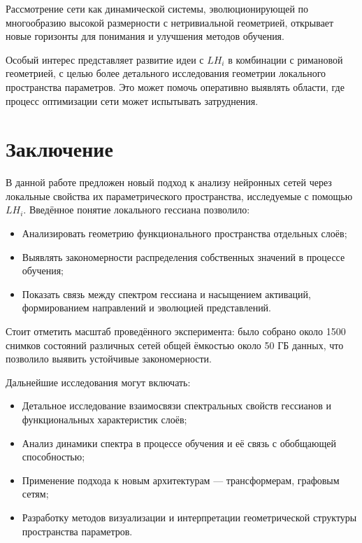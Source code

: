 \documentclass[a4paper,12pt]{article}
\begin{document}
Рассмотрение сети как динамической системы, эволюционирующей по многообразию высокой размерности с
нетривиальной геометрией, открывает новые горизонты для понимания и улучшения методов обучения.

Особый интерес представляет развитие идеи с $LH_i$ в комбинации с римановой геометрией,
с целью более детального исследования геометрии локального пространства параметров. Это может помочь оперативно
выявлять области, где процесс оптимизации сети может испытывать затруднения.

\section{Заключение}
В данной работе предложен новый подход к анализу нейронных сетей через локальные свойства их параметрического
пространства, исследуемые с помощью $LH_i$. Введённое понятие локального гессиана позволило:
\begin{itemize}
  \item Анализировать геометрию функционального пространства отдельных слоёв;
  \item Выявлять закономерности распределения собственных значений в процессе обучения;
  \item Показать связь между спектром гессиана и насыщением активаций, формированием направлений и эволюцией
    представлений.
\end{itemize}

Стоит отметить масштаб проведённого эксперимента: было собрано около 1500 снимков состояний различных сетей
общей ёмкостью около 50 ГБ данных, что позволило выявить устойчивые закономерности.

Дальнейшие исследования могут включать:
\begin{itemize}
  \item Детальное исследование взаимосвязи спектральных свойств гессианов и функциональных характеристик слоёв;
  \item Анализ динамики спектра в процессе обучения и её связь с обобщающей способностью;
  \item Применение подхода к новым архитектурам — трансформерам, графовым сетям;
  \item Разработку методов визуализации и интерпретации геометрической структуры пространства параметров.
\end{itemize}
\end{document}
